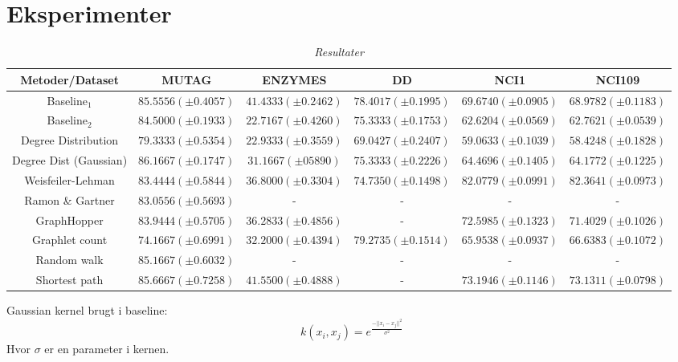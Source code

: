 \documentclass{article}
\begin{document}
\section{Eksperimenter}
\begin{table}[H]
\begin{center}
\scalebox{0.7} {
\begin{tabular}{c|c|c|c|c|c}
Metoder/Dataset & MUTAG & ENZYMES & DD & NCI1 & NCI109 \\
\hline
Baseline$_1$ & $85.5556(\pm 0.4057)$ & $41.4333(\pm 0.2462)$ & $78.4017(\pm 0.1995)$ & $69.6740(\pm 0.0905)$ & $68.9782(\pm 0.1183)$ \\
Baseline$_2$ & $84.5000 (\pm 0.1933)$ & $22.7167 (\pm 0.4260)$ & $75.3333 (\pm 0.1753)$ & $62.6204 (\pm 0.0569)$ & $62.7621 (\pm 0.0539)$ \\
Degree Distribution & $79.3333 (\pm 0.5354)$ & $22.9333 (\pm 0.3559)$ & $69.0427 (\pm 0.2407)$ & $59.0633 (\pm 0.1039)$ & $58.4248 (\pm 0.1828)$ \\
Degree Dist (Gaussian) & $86.1667 (\pm 0.1747)$ & $31.1667 (\pm 05890)$  & $75.3333 (\pm 0.2226)$ & $64.4696 (\pm 0.1405)$ & $64.1772 (\pm 0.1225)$ \\
Weisfeiler-Lehman & $83.4444 (\pm 0.5844)$ & $36.8000 (\pm 0.3304)$ & $74.7350 (\pm 0.1498)$ & $82.0779 (\pm 0.0991)$ &  $82.3641 (\pm 0.0973)$ \\
Ramon \& Gartner & $83.0556 (\pm 0.5693)$ & - & - & - & - \\
GraphHopper & $83.9444 (\pm 0.5705)$ & $36.2833 (\pm 0.4856)$ & - & $72.5985 (\pm 0.1323)$ & $71.4029 (\pm 0.1026)$ \\
Graphlet count & $74.1667 (\pm 0.6991)$ & $32.2000 (\pm 0.4394)$ & $79.2735 (\pm 0.1514)$ & $65.9538 (\pm 0.0937)$ & $66.6383 (\pm 0.1072)$ \\
Random walk & $85.1667 (\pm 0.6032)$ & - & - & - & - \\
Shortest path & $85.6667 (\pm 0.7258)$ & $41.5500 (\pm 0.4888)$ & - & $73.1946 (\pm 0.1146)$ & $73.1311 (\pm 0.0798)$ \\
\end{tabular}
}
\caption{\textit{Resultater}}
\end{center}
\end{table}

Gaussian kernel brugt i baseline:
$$k(x_i,x_j)=e^{\frac{-||x_i-x_j||^2}{\sigma^2}}$$
Hvor $\sigma$ er en parameter i kernen.
\end{document}
